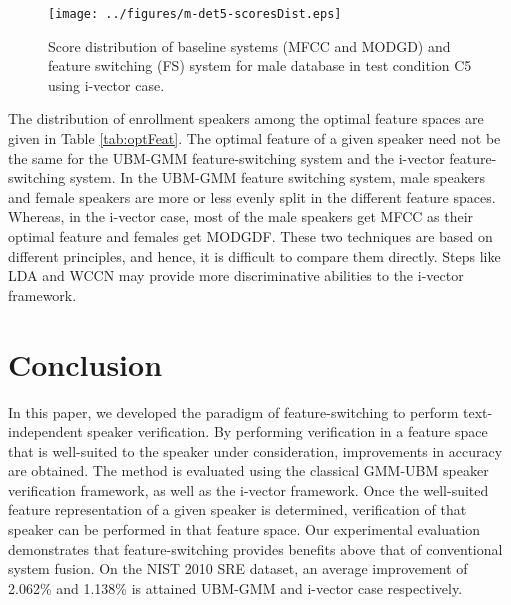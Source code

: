 \documentclass[preprint,12pt,5p]{elsarticle}
\begin{document}
\begin{figure*}[h!tb]
\centering
\texttt{[image: ../figures/m-det5-scoresDist.eps]}
\caption{Score distribution of baseline systems (MFCC and MODGD) and feature switching (FS) system for male database in test condition C5 using i-vector case.}
\label{fig:scoreDist}
\end{figure*}




The distribution of enrollment speakers among the optimal feature spaces
are given in Table \ref{tab:optFeat}. The optimal feature of a given speaker need
not be the same for the UBM-GMM feature-switching system and the i-vector
feature-switching system. %
In the UBM-GMM feature switching system, male speakers and female speakers are more or less
evenly split in the different feature spaces. Whereas, in the i-vector case, most of the male 
speakers get MFCC as their optimal feature and females get MODGDF. These two techniques are 
based on different principles, and hence, it is difficult to compare them directly. Steps like LDA and 
WCCN may provide more discriminative abilities to the i-vector framework.


\section{Conclusion}
\label{sec:conclude}

In this paper, we developed the paradigm of feature-switching to perform
text-independent speaker verification. By performing verification in a
feature space that is well-suited to the speaker under consideration,
improvements in accuracy are obtained. The method is evaluated using the
classical GMM-UBM speaker verification framework, as well as the i-vector
framework. Once the well-suited feature representation of a given speaker is
determined, verification of that speaker can be performed in that feature space.
Our experimental evaluation demonstrates that feature-switching
provides benefits above that of conventional system fusion. On the NIST 2010 SRE
dataset, an average improvement of 2.062\% and 1.138\% is attained UBM-GMM and i-vector case respectively.
\end{document}
